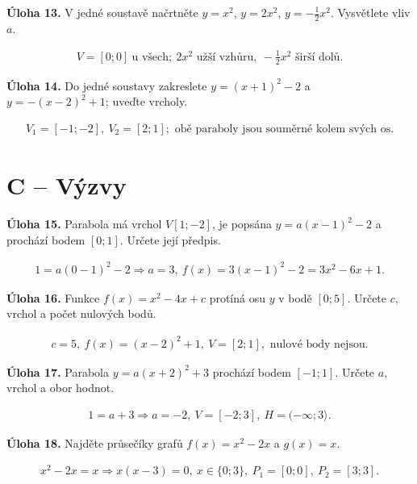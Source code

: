 \documentclass[11pt,a4paper]{article}
\begin{document}
\noindent\textbf{Úloha 13.} V jedné soustavě načrtněte $y=x^2$, $y=2x^2$, $y=-\frac12x^2$. Vysvětlete vliv $a$.\par
\[\begin{aligned}V=[0;0]\ \text{u všech};\ 2x^2\text{ užší vzhůru},\ -\frac12x^2\text{ širší dolů}.\end{aligned}\]\par
\noindent\textbf{Úloha 14.} Do jedné soustavy zakreslete $y=(x+1)^2-2$ a $y=-(x-2)^2+1$; uveďte vrcholy.\par
\[\begin{aligned}V_1=[-1;-2],\ V_2=[2;1];\text{ obě paraboly jsou souměrné kolem svých os}.\end{aligned}\]\par
\section*{C – Výzvy}
\noindent\textbf{Úloha 15.} Parabola má vrchol $V[1;-2]$, je popsána $y=a(x-1)^2-2$ a prochází bodem $[0;1]$. Určete její předpis.\par
\[\begin{aligned}1=a(0-1)^2-2\Rightarrow a=3,\ f(x)=3(x-1)^2-2=3x^2-6x+1.\end{aligned}\]\par
\noindent\textbf{Úloha 16.} Funkce $f(x)=x^2-4x+c$ protíná osu $y$ v bodě $[0;5]$. Určete $c$, vrchol a počet nulových bodů.\par
\[\begin{aligned}c=5,\ f(x)=(x-2)^2+1,\ V=[2;1],\text{ nulové body nejsou}.\end{aligned}\]\par
\noindent\textbf{Úloha 17.} Parabola $y=a(x+2)^2+3$ prochází bodem $[-1;1]$. Určete $a$, vrchol a obor hodnot.\par
\[\begin{aligned}1=a+3\Rightarrow a=-2,\ V=[-2;3],\ H=(-\infty;3\rangle.\end{aligned}\]\par
\noindent\textbf{Úloha 18.} Najděte průsečíky grafů $f(x)=x^2-2x$ a $g(x)=x$.\par
\[\begin{aligned}x^2-2x=x\Rightarrow x(x-3)=0,\ x\in\{0;3\},\ P_1=[0;0],\ P_2=[3;3].\end{aligned}\]\par
\end{document}
